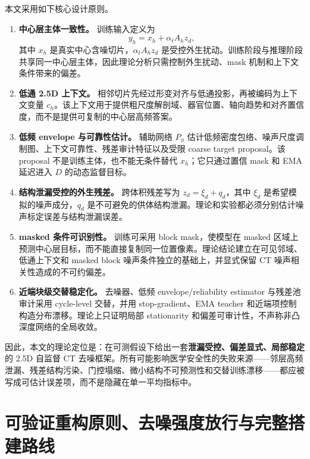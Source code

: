 \documentclass[11pt,a4paper,UTF8,fontset=fandol]{ctexart}
\theoremstyle{definition}
\begin{document}
本文采用如下核心设计原则。
\begin{enumerate}[leftmargin=2em]
    \item \textbf{中心层主体一致性。} 训练输入定义为
    \begin{equation}
        y_h=x_h+\alpha_tA_hz_d,
    \end{equation}
    其中 $x_h$ 是真实中心含噪切片，$\alpha_tA_hz_d$ 是受控外生扰动。训练阶段与推理阶段共享同一中心层主体，因此理论分析只需控制外生扰动、mask 机制和上下文条件带来的偏差。

    \item \textbf{低通 2.5D 上下文。} 相邻切片先经过形变对齐与低通投影，再被编码为上下文变量 $c_h$。该上下文用于提供粗尺度解剖域、器官位置、轴向趋势和对齐置信度，而不是提供可复制的中心层高频答案。

    \item \textbf{低频 envelope 与可靠性估计。} 辅助网络 $P_\phi$ 估计低频密度包络、噪声尺度调制图、上下文可靠性、残差审计特征以及受限 coarse target proposal。该 proposal 不是训练主体，也不能无条件替代 $x_h$；它只通过置信 mask 和 EMA 延迟进入 $D$ 的动态监督目标。

    \item \textbf{结构泄漏受控的外生残差。} 跨体积残差写为 $z_d=\xi_d+q_d$，其中 $\xi_d$ 是希望模拟的噪声成分，$q_d$ 是不可避免的供体结构泄漏。理论和实验都必须分别估计噪声标定误差与结构泄漏误差。

    \item \textbf{masked 条件可识别性。} 训练可采用 block mask，使模型在 masked 区域上预测中心层目标，而不能直接复制同一位置像素。理论结论建立在可见邻域、低通上下文和 masked block 噪声条件独立的基础上，并显式保留 CT 噪声相关性造成的不可约偏差。

    \item \textbf{近端块级交替稳定化。} 去噪器、低频 envelope/reliability estimator 与残差池审计采用 cycle-level 交替，并用 stop-gradient、EMA teacher 和近端项控制构造分布漂移。理论上只证明局部 stationarity 和偏差可审计性，不声称非凸深度网络的全局收敛。
\end{enumerate}

因此，本文的理论定位是：在可测假设下给出一套\textbf{泄漏受控、偏差显式、局部稳定}的 2.5D 自监督 CT 去噪框架。所有可能影响医学安全性的失败来源——邻层高频泄漏、残差结构污染、门控塌缩、微小结构不可预测性和交替训练漂移——都应被写成可估计误差项，而不是隐藏在单一平均指标中。




\section{可验证重构原则、去噪强度放行与完整搭建路线}
\label{sec:trace-verifiable-redesign}
\end{document}
